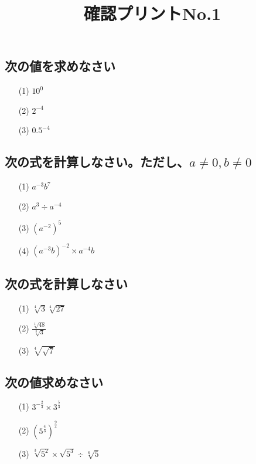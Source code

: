 \documentclass[12pt]{jarticle}
\title{確認プリントNo.1}
\begin{document}
\date{}
\maketitle
\vspace{-2cm}
\subsection*{次の値を求めなさい}
\begin{itemize}
  \item [(1)] $10^0$
  \item [(2)] $2^{-4}$
  \item [(3)] ${0.5}^{-4}$
\end{itemize}

\subsection*{次の式を計算しなさい。ただし、$a\neq 0, b\neq 0$}
\begin{itemize}
  \item [(1)] $a^{-3}b^7$
  \item [(2)] $a^3 \div a^{-4}$
  \item [(3)] $(a^{-2})^5$
  \item [(4)] $(a^{-3}b)^{-2} \times a^{-4}b$
\end{itemize}

\subsection*{次の式を計算しなさい}
\begin{itemize}
  \item [(1)] $\sqrt[4]{3}\sqrt[4]{27}$
  \item [(2)] $\displaystyle \frac{\sqrt[3]{48}}{\sqrt[3]{3}}$
  \item [(3)] $\sqrt[4]{\sqrt{7}}$
\end{itemize}

\subsection*{次の値求めなさい}
\begin{itemize}
  \item [(1)] $\displaystyle 3^{-\frac{2}{3}}\times 3^{\frac{5}{3}}$
  \item [(2)] $\displaystyle (5^{\frac{4}{3}})^{\frac{9}{4}}$
  \item [(3)] $\displaystyle \sqrt[3]{5^2} \times \sqrt{5^3} \div  \sqrt[6]{5}$
\end{itemize}
\end{document}
